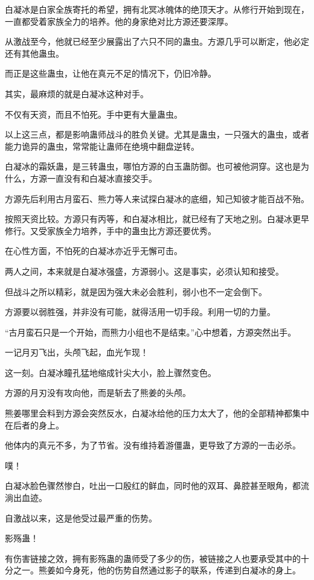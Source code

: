 \begin{this_body}
白凝冰是白家全族寄托的希望，拥有北冥冰魄体的绝顶天才。从修行开始到现在，一直都受着家族全力的培养。他的身家绝对比方源还要深厚。

从激战至今，他就已经至少展露出了六只不同的蛊虫。方源几乎可以断定，他必定还有其他蛊虫。

而正是这些蛊虫，让他在真元不足的情况下，仍旧冷静。

其实，最麻烦的就是白凝冰这种对手。

不仅有天资，而且不怕死。手中更有大量蛊虫。

以上这三点，都是影响蛊师战斗的胜负关键。尤其是蛊虫，一只强大的蛊虫，或者能力诡异的蛊虫，常常能让蛊师在绝境中翻盘逆转。

白凝冰的霜妖蛊，是三转蛊虫，哪怕方源的白玉蛊防御。也可被他洞穿。这也是为什么，方源一直没有和白凝冰直接交手。

方源先后利用古月蛮石、熊力等人来试探白凝冰的底细，知己知彼才能百战不殆。

按照天资比较。方源只有丙等，和白凝冰相比，就已经有了天地之别。白凝冰更早修行。又受家族全力培养，手中的蛊虫比方源还要优秀。

在心性方面，不怕死的白凝冰亦近乎无懈可击。

两人之间，本来就是白凝冰强盛，方源弱小。这是事实，必须认知和接受。

但战斗之所以精彩，就是因为强大未必会胜利，弱小也不一定会倒下。

方源要以弱胜强，并非没有可能，就得活用一切手段。利用一切的力量。

“古月蛮石只是一个开始，而熊力小组也不是结束。”心中想着，方源突然出手。

一记月刃飞出，头颅飞起，血光乍现！

这一刻。白凝冰瞳孔猛地缩成针尖大小，脸上骤然变色。

方源的月刃没有攻向他，而是斩去了熊姜的头颅。

熊姜哪里会料到方源会突然反水，白凝冰给他的压力太大了，他的全部精神都集中在后者的身上。

他体内的真元不多，为了节省。没有维持着游僵蛊，更导致了方源的一击必杀。

噗！

白凝冰脸色骤然惨白，吐出一口殷红的鲜血，同时他的双耳、鼻腔甚至眼角，都流淌出血迹。

自激战以来，这是他受过最严重的伤势。

影殇蛊！

有伤害链接之效，拥有影殇蛊的蛊师受了多少的伤，被链接之人也要承受其中的十分之一。熊姜如今身死，他的伤势自然通过影子的联系，传递到白凝冰的身上。


\end{this_body}
